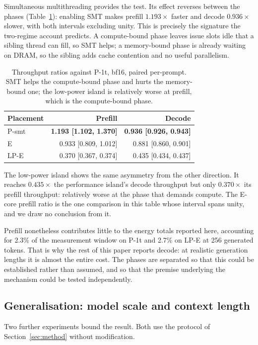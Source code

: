 \documentclass[journal]{IEEEtran}
\begin{document}
Simultaneous multithreading provides the test. Its effect reverses between the
phases (Table~\ref{tab:prefill}): enabling SMT makes prefill $1.193\times$
faster and decode $0.936\times$ slower, with both intervals excluding unity.
This is precisely the signature the two-regime account predicts. A
compute-bound phase leaves issue slots idle that a sibling thread can fill, so
SMT helps; a memory-bound phase is already waiting on DRAM, so the sibling adds
cache contention and no useful parallelism.

\begin{table}[t]
\centering
\caption{Throughput ratios against P-1t, bf16, paired per-prompt. SMT helps the
compute-bound phase and hurts the memory-bound one; the low-power island is
relatively worse at prefill, which is the compute-bound phase.}
\label{tab:prefill}
\begin{tabular}{lrr}
\toprule
Placement & Prefill & Decode \\
\midrule
P-smt & \textbf{1.193 [1.102, 1.370]} & \textbf{0.936 [0.926, 0.943]} \\
E     & 0.933 [0.809, 1.012] & 0.881 [0.860, 0.901] \\
LP-E  & 0.370 [0.367, 0.374] & 0.435 [0.434, 0.437] \\
\bottomrule
\end{tabular}
\end{table}

The low-power island shows the same asymmetry from the other direction. It
reaches $0.435\times$ the performance island's decode throughput but only
$0.370\times$ its prefill throughput: relatively worse at the phase that
demands compute. The E-core prefill ratio is the one comparison in this table
whose interval spans unity, and we draw no conclusion from it.

Prefill nonetheless contributes little to the energy totals reported here,
accounting for 2.3\% of the measurement window on P-1t and 2.7\% on LP-E at 256
generated tokens. That is why the rest of this paper reports decode: at
realistic generation lengths it is almost the entire cost. The phases are
separated so that this could be established rather than assumed, and so that
the premise underlying the mechanism could be tested independently.

\subsection{Generalisation: model scale and context length}
\label{sec:generalisation}
Two further experiments bound the result. Both use the protocol of
Section~\ref{sec:method} without modification.
\end{document}
